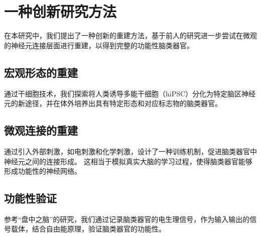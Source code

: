 \chapter{一种创新研究方法}\label{chap:methodlogy}
在本研究中，我们提出了一种创新的重建方法，基于前人的研究进一步尝试在微观的神经元连接层面进行重建，以得到完整的功能性脑类器官。

\section{宏观形态的重建}\label{sec:macro-reconstruction}
通过干细胞技术，我们探索将人类诱导多能干细胞（hiPSC）分化为特定脑区神经元的新途径，并在体外培养出具有特定形态和对应标志物的脑类器官。

\section{微观连接的重建}\label{sec:micro-reconstruction}
通过引入外部刺激，如电刺激和化学刺激，设计了一种训练机制，促进脑类器官中神经元之间的连接形成。
这相当于模拟真实大脑的学习过程，使得脑类器官能够形成功能性的神经网络。

\section{功能性验证}\label{sec:functional-verification}
参考“盘中之脑”的研究，我们通过记录脑类器官的电生理信号，作为输入输出的信号载体，结合自由能原理，验证脑类器官的功能性。
